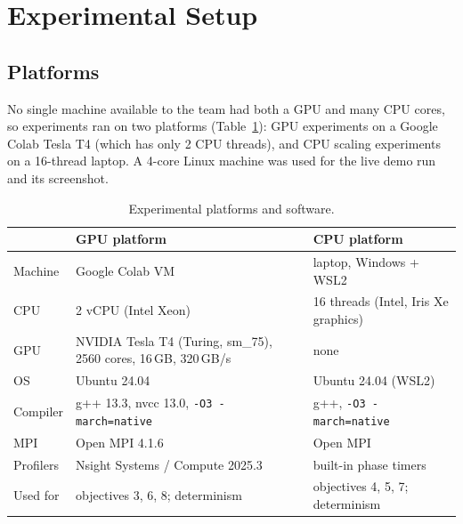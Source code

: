 
\section{Experimental Setup}\label{sec:setup}

\subsection{Platforms}
No single machine available to the team had both a GPU and many CPU cores, so experiments ran on
two platforms (Table~\ref{tab:platforms}): GPU experiments on a Google Colab Tesla T4 (which has
only 2 CPU threads), and CPU scaling experiments on a 16-thread laptop. A 4-core Linux machine
was used for the live demo run and its screenshot.

\begin{table}[t]
\centering
\caption{Experimental platforms and software.}
\label{tab:platforms}
\footnotesize
\begin{tabularx}{\columnwidth}{@{}l X X@{}}
\toprule
 & GPU platform & CPU platform\\
\midrule
Machine & Google Colab VM & laptop, Windows + WSL2\\
CPU & 2 vCPU (Intel Xeon) & 16 threads (Intel, Iris Xe graphics)\\
GPU & NVIDIA Tesla T4 (Turing, sm\_75), 2560 cores, 16\,GB, 320\,GB/s & none\\
OS & Ubuntu 24.04 & Ubuntu 24.04 (WSL2)\\
Compiler & g++ 13.3, nvcc 13.0, \texttt{-O3 -march=native} & g++, \texttt{-O3 -march=native}\\
MPI & Open MPI 4.1.6 & Open MPI\\
Profilers & Nsight Systems / Compute 2025.3 & built-in phase timers\\
Used for & objectives 3, 6, 8; determinism & objectives 4, 5, 7; determinism\\
\bottomrule
\end{tabularx}
\end{table}

